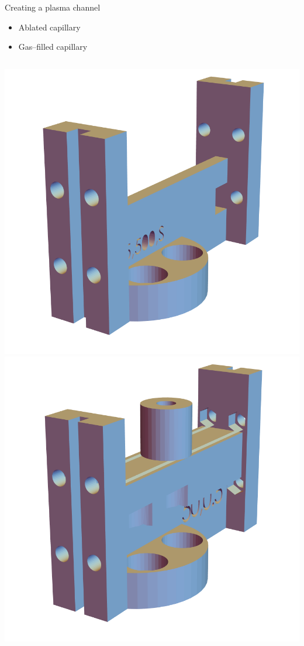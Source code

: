\documentclass[dvipsnames]{beamer}
\begin{document}
\begin{frame}{Creating a plasma channel}
   \begin{itemize}
     \item Ablated capillary
     \item Gas--filled capillary
   \end{itemize}
   \begin{columns}
    \includegraphics[width=\textwidth]{figures/theory/ablated.png}
    \includegraphics[width=\textwidth]{figures/theory/gasfilled.png}
    \end{columns}
   \end{frame}
\end{document}
